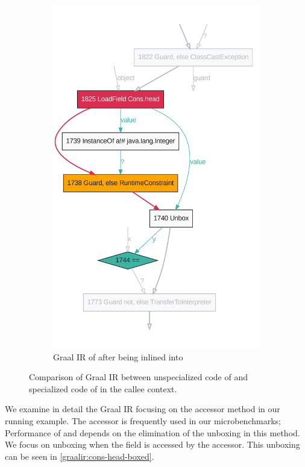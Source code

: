 \begin{figure}[!htb]
\begin{subfigure}[b]{0.45\textwidth}
		\includegraphics[width=\textwidth]{figures/dot/List.contains.boxed.TruffleTier.png}
		\caption{Graal IR of  after being inlined into }
		\label{graalir:cons-contains-head-focus-boxed}
	\end{subfigure}
	\hfill
	\caption{Comparison of Graal IR between unspecialized code of  and specialized code of  in the callee context.}
\end{figure}

We examine in detail the Graal IR focusing on the  accessor method in our  running example.
The accessor is frequently used in our  microbenchmarks; Performance of  and  depends on the elimination of the unboxing in this method.
We focus on unboxing when the  field is accessed by the  accessor.
This unboxing can be seen in \ref{graalir:cons-head-boxed}.

